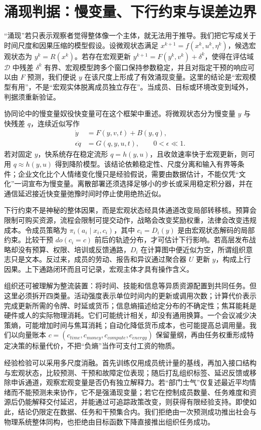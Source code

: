 \section{涌现判据：慢变量、下行约束与误差边界}
\label{sec:section_7635}

“涌现”若只表示观察者觉得整体像一个主体，就无法用于推导。我们把它写成关于时间尺度和因果压缩的模型假设。设微观状态满足 $x^{k+1}=f(x^k,u^k,\eta^k)$，候选宏观状态为 $y^k=R(x^k)$。若存在宏观更新 $y^{k+1}=F(y^k,v^k)+\delta^k$，使得在评估域 $\mathcal D$ 中残差 $\delta^k$ 有界、宏观模型跨多个窗口保持参数稳定，并且对指定干预的响应可以由 $F$ 预测，我们便说 $y$ 在该尺度上形成了有效涌现变量。这里的结论是“宏观模型有用”，不是“宏观实体脱离成员独立存在”。当成员、目标或环境改变到域外，判据须重新验证。

协同论中的慢变量奴役快变量可在这个框架中重述。将微观状态分为慢变量 $y$ 与快残差 $q$，连续近似写作
\begin{align}
\dot y &= F(y,v,t)+B(y,q),\\
\epsilon\dot q &= G(q,y,u,t),\qquad 0<\epsilon\ll1.
\end{align}
若对固定 $y$，快系统存在稳定流形 $q=h(y,u)$，且收敛速率快于宏观更新，则可用 $q\approx h(y,u)$ 得到降阶模型。该结论依赖稳定性、尺度分离和输入有界等条件；企业文化比个人情绪变化慢只是经验假说，需要由数据估计，不能仅凭“文化”一词宣布为慢变量。离散部署还须选择足够小的步长或采用稳定积分器，并在通信延迟接近快变量弛豫时间时停止使用绝热近似。

下行约束不是神秘的整体因果，而是宏观状态经具体通道改变局部转移核。预算会限制可购买资源，流程会限制可提交动作，战略会改变奖励权重，法律会改变违规成本。令成员策略为 $\pi_i(a_i\mid x_i,c_i)$，其中 $c_i=D_i(y)$ 是由宏观状态解码的局部约束。比较干预 $do(c_i=c)$ 前后的轨迹分布，才可估计下行影响。若高层发布战略却没有预算、权限、培训或反馈通路，$D_i$ 在计算图中便近似为空，所谓组织意志只是文本。反过来，成员的劳动、报告和异议通过聚合器 $U$ 更新 $y$，构成上行因果。上下通路闭环而且可记录，宏观主体才具有操作含义。

组织还可被理解为整流装置：将时间、技能和信息等异质资源配置到共同任务。但这里必须拆开四类量。活动强度表示单位时间内的更新或调用次数；计算代价表示完成更新所需的令牌、时延或货币；信息熵描述给定分布的不确定性；焦耳能耗是硬件或人的实际物理消耗。它们可能统计相关，却没有通用换算。一个会议减少决策熵，可能增加时间与焦耳消耗；自动化降低货币成本，也可能提高总调用量。我们以向量账本 $c=(c_{time},c_{money},c_{compute},c_{energy})$ 保留量纲，再由任务权重形成特定决策的标量代价，不把“负熵”当作可支付工资的物质。

经验检验可以采用多尺度消融。首先训练仅用成员统计量的基线，再加入接口结构与宏观状态，比较预测、干预和故障定位表现；随后打乱组织标签、延迟反馈或移除申诉通道，观察宏观变量是否仍有独立解释力。若“部门士气”仅复述最近平均情绪而不能预测未来协作，它不是强涌现变量；若它在控制成员数量、任务难度和资源后仍能解释交付延迟，并能通过可追踪政策改变，则获得有限经验支持。即使如此，结论仍限定在数据、任务和干预集合内。我们拒绝由一次预测成功推出社会与物理系统整体同构，也拒绝由目标函数下降直接推出组织任务成功。

